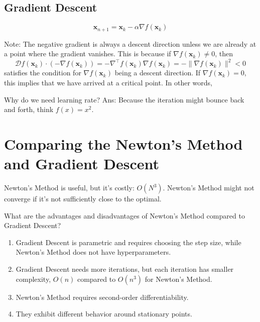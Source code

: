 \documentclass[11pt]{article}
\theoremstyle{plain} %
\newenvironment{topic}
{\color{C2}\normalfont\begin{framed}\begingroup }
  {\endgroup\end{framed}}
\theoremstyle{remark}
\begin{document}
\subsection{Gradient Descent}
\begin{topic}
  $$
    \mathbf{x}_{n+1}=\mathbf{x}_k-\alpha \nabla f\left(\mathbf{x}_k\right)
  $$

  Note: The negative gradient is always a descent direction unless we are already at a point where the gradient vanishes.
  This is because if $\nabla f\left(\mathbf{x}_k\right) \neq 0$, then
  $$
    \mathcal{D} f\left(\mathbf{x}_k\right) \cdot \left(-\nabla f\left(\mathbf{x}_k\right)\right)
    = -\nabla^\top f\left(\mathbf{x}_k\right)\nabla f\left(\mathbf{x}_k\right)
    = - \|\nabla f\left(\mathbf{x}_k\right) \|^2 < 0
  $$ satisfies the condition for $\nabla f\left(\mathbf{x}_k\right)$ being a descent direction.
  If $\nabla f\left(\mathbf{x}_k\right) = 0$, this implies that we have arrived at a critical point.
  In other words,

  Why do we need learning rate?
  Ans: Because the iteration might bounce back and forth, think $f(x) = x^2$.

\end{topic}






\section{Comparing the Newton's Method and Gradient Descent}
\begin{topic}
  Newton's Method is useful, but it's costly: $O(N^3)$. Newton's Method might
  not converge if it's not sufficiently close to the optimal.

  What are the advantages and disadvantages of Newton's Method compared to Gradient Descent?
  \begin{enumerate}
    \item Gradient Descent is parametric and requires choosing the step size, while Newton's Method does not have hyperparameters.
    \item Gradient Descent needs more iterations, but each iteration has smaller complexity, $O(n)$ compared to $O(n^3)$ for Newton's Method.
    \item Newton's Method requires second-order differentiability.
    \item They exhibit different behavior around stationary points.
  \end{enumerate}

\end{topic}
\end{document}
